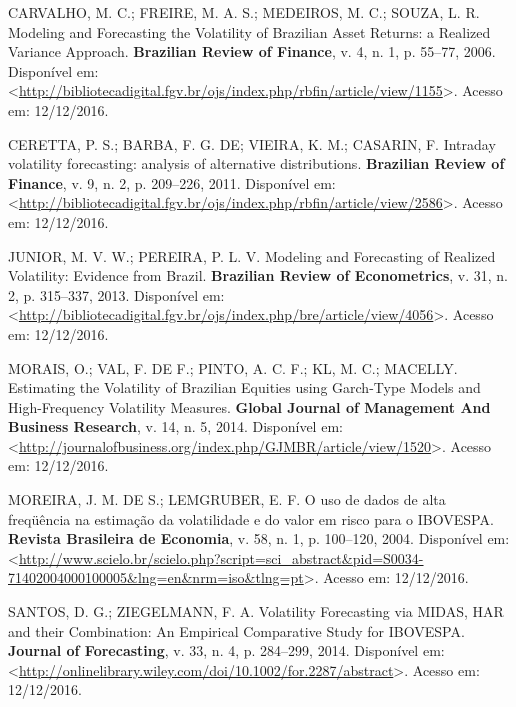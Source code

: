 \documentclass[]{article}
\begin{document}
\setlength{\parindent}{0in}

\hypertarget{refs}{}
\hypertarget{ref-carvalho_modeling_2006}{}
CARVALHO, M. C.; FREIRE, M. A. S.; MEDEIROS, M. C.; SOUZA, L. R.
Modeling and Forecasting the Volatility of Brazilian Asset Returns: a
Realized Variance Approach. \textbf{Brazilian Review of Finance}, v. 4,
n. 1, p. 55--77, 2006. Disponível em:
\textless{}\url{http://bibliotecadigital.fgv.br/ojs/index.php/rbfin/article/view/1155}\textgreater{}.
Acesso em: 12/12/2016.

\hypertarget{ref-ceretta_intraday_2011}{}
CERETTA, P. S.; BARBA, F. G. DE; VIEIRA, K. M.; CASARIN, F. Intraday
volatility forecasting: analysis of alternative distributions.
\textbf{Brazilian Review of Finance}, v. 9, n. 2, p. 209--226, 2011.
Disponível em:
\textless{}\url{http://bibliotecadigital.fgv.br/ojs/index.php/rbfin/article/view/2586}\textgreater{}.
Acesso em: 12/12/2016.

\hypertarget{ref-junior_modeling_2013}{}
JUNIOR, M. V. W.; PEREIRA, P. L. V. Modeling and Forecasting of Realized
Volatility: Evidence from Brazil. \textbf{Brazilian Review of
Econometrics}, v. 31, n. 2, p. 315--337, 2013. Disponível em:
\textless{}\url{http://bibliotecadigital.fgv.br/ojs/index.php/bre/article/view/4056}\textgreater{}.
Acesso em: 12/12/2016.

\hypertarget{ref-morais_estimating_2014}{}
MORAIS, O.; VAL, F. DE F.; PINTO, A. C. F.; KL, M. C.; MACELLY.
Estimating the Volatility of Brazilian Equities using Garch-Type Models
and High-Frequency Volatility Measures. \textbf{Global Journal of
Management And Business Research}, v. 14, n. 5, 2014. Disponível em:
\textless{}\url{http://journalofbusiness.org/index.php/GJMBR/article/view/1520}\textgreater{}.
Acesso em: 12/12/2016.

\hypertarget{ref-moreira_o_2004}{}
MOREIRA, J. M. DE S.; LEMGRUBER, E. F. O uso de dados de alta freqüência
na estimação da volatilidade e do valor em risco para o IBOVESPA.
\textbf{Revista Brasileira de Economia}, v. 58, n. 1, p. 100--120, 2004.
Disponível em:
\textless{}\url{http://www.scielo.br/scielo.php?script=sci_abstract\&pid=S0034-71402004000100005\&lng=en\&nrm=iso\&tlng=pt}\textgreater{}.
Acesso em: 12/12/2016.

\hypertarget{ref-santos_volatility_2014}{}
SANTOS, D. G.; ZIEGELMANN, F. A. Volatility Forecasting via MIDAS, HAR
and their Combination: An Empirical Comparative Study for IBOVESPA.
\textbf{Journal of Forecasting}, v. 33, n. 4, p. 284--299, 2014.
Disponível em:
\textless{}\url{http://onlinelibrary.wiley.com/doi/10.1002/for.2287/abstract}\textgreater{}.
Acesso em: 12/12/2016.
\end{document}
